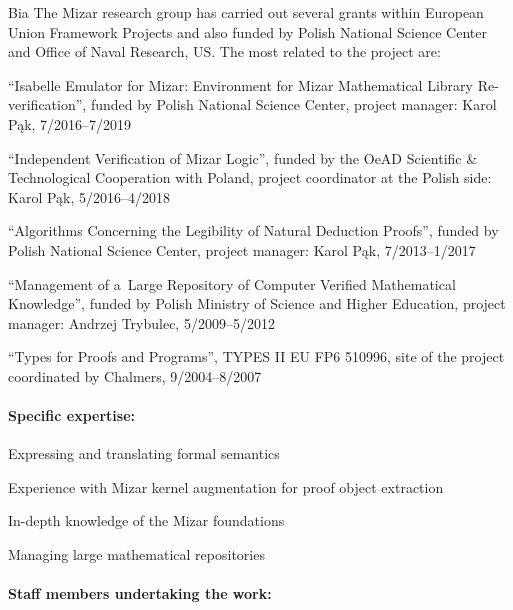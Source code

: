 \begin{sitedescription}{Bia}
The Mizar research group has carried out several grants within European Union Framework Projects and also funded by Polish National Science Center and Office of Naval Research, US.
The most related to the project are:

\begin{compactitem}
\item ``Isabelle Emulator for Mizar: Environment for Mizar Mathematical Library Re-verification'', funded by Polish National Science Center, project manager: Karol Pąk, 7/2016--7/2019
\item ``Independent Verification of Mizar Logic'', funded by the OeAD Scientific \& Technological Cooperation with Poland, project coordinator at the Polish side: Karol Pąk, 5/2016--4/2018
\item ``Algorithms Concerning the Legibility of Natural Deduction Proofs'', funded by Polish National Science Center, project manager: Karol Pąk, 7/2013--1/2017
\item ``Management of a~Large Repository of Computer Verified Mathematical Knowledge'', funded by Polish Ministry of Science and Higher Education, project manager: Andrzej Trybulec, 5/2009--5/2012
\item ``Types for Proofs and Programs'', TYPES II EU FP6 510996, site of the project coordinated by Chalmers, 9/2004--8/2007
\end{compactitem}

\paragraph{Specific expertise:}

\begin{compactitem}
\item Expressing and translating formal semantics
\item Experience with Mizar kernel augmentation for proof object extraction
\item In-depth knowledge of the Mizar foundations
\item Managing large mathematical repositories
\end{compactitem}

\paragraph{Staff members undertaking the work:}


\end{sitedescription}
